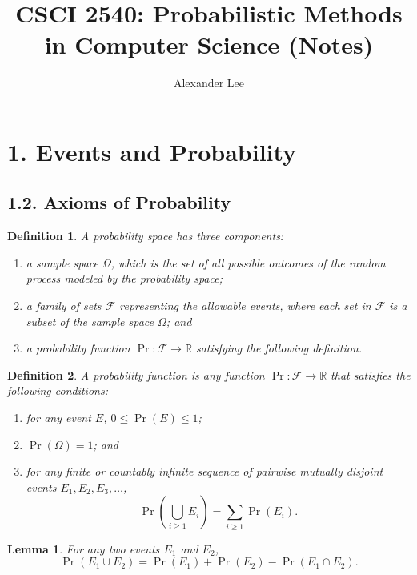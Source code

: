 \documentclass{amsart}
\title{CSCI 2540: Probabilistic Methods in Computer Science (Notes)}
\author{Alexander Lee}
\newtheorem*{definition}{Definition}
\newtheorem*{lemma}{Lemma}
\newcommand{\R}{\mathbb{R}}
\begin{document}
\maketitle

\section*{1. Events and Probability}

\subsection*{1.2. Axioms of Probability}

\begin{definition}
  A probability space has three components:
  \begin{enumerate}
    \item a sample space $\Omega$, which is the set of all possible outcomes of
      the random process modeled by the probability space;
    \item a family of sets $\mathcal{F}$ representing the allowable events,
      where each set in $\mathcal{F}$ is a subset of the sample space $\Omega$;
      and
    \item a probability function $\Pr: \mathcal{F} \to \R$ satisfying the
      following definition.
  \end{enumerate}
\end{definition}

\begin{definition}
  A probability function is any function $\Pr: \mathcal{F} \to \R$ that
  satisfies the following conditions:
  \begin{enumerate}
    \item for any event $E$, $0 \leq \Pr(E) \leq 1$;
    \item $\Pr(\Omega) = 1$; and
    \item for any finite or countably infinite sequence of pairwise mutually
      disjoint events $E_1, E_2, E_3, \ldots$,
      \[
        \Pr \left( \bigcup_{i \geq 1} E_i \right) = \sum_{i \geq 1} \Pr(E_i).
      \]
  \end{enumerate}
\end{definition}

\begin{lemma}
  For any two events $E_1$ and $E_2$,
  \[
    \Pr(E_1 \cup E_2) = \Pr(E_1) + \Pr(E_2) - \Pr(E_1 \cap E_2).
  \]
\end{lemma}
\end{document}
